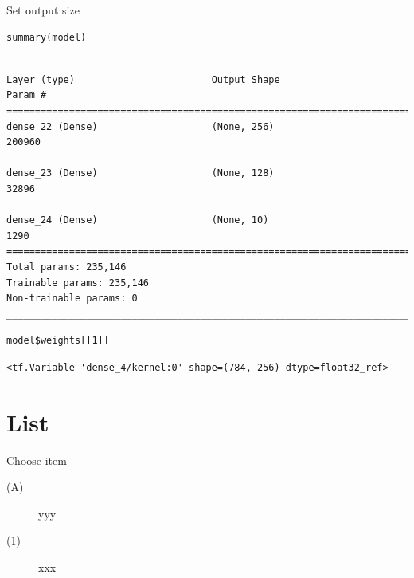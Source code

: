 \documentclass[table]{beamer}
\begin{document}
\begin{frame}[fragile,label={sec:org198137b}]{Set output size}
 \lstset{language=r,label= ,caption= ,captionpos=b,numbers=none}
\begin{lstlisting}
summary(model)
\end{lstlisting}


{

\begin{verbatim}
________________________________________________________________________________
Layer (type)                        Output Shape                    Param #     
================================================================================
dense_22 (Dense)                    (None, 256)                     200960      
________________________________________________________________________________
dense_23 (Dense)                    (None, 128)                     32896       
________________________________________________________________________________
dense_24 (Dense)                    (None, 10)                      1290        
================================================================================
Total params: 235,146
Trainable params: 235,146
Non-trainable params: 0
________________________________________________________________________________
\end{verbatim}

}

\lstset{language=r,label= ,caption= ,captionpos=b,numbers=none}
\begin{lstlisting}
model$weights[[1]]
\end{lstlisting}

{

\begin{verbatim}
<tf.Variable 'dense_4/kernel:0' shape=(784, 256) dtype=float32_ref>
\end{verbatim}

}
\end{frame}

\section{List}
\label{sec:org81bd660}

\begin{frame}[label={sec:orga93a433}]{Choose item}
\begin{description}
\item[{(A)}] yyy
\item[{(1)}] xxx
\end{description}
\end{frame}
\end{document}
